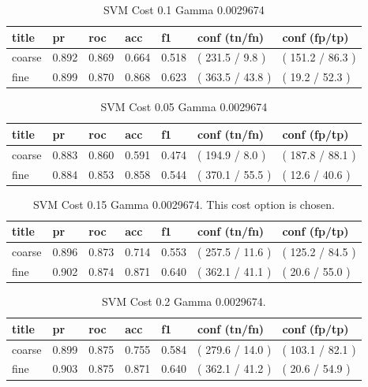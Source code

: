 \documentclass[ms]{nuthesis}
\begin{document}
\FloatBarrier
\begin{table}[H]
\centering
\caption{SVM Cost 0.1 Gamma 0.0029674}
\label{tab:SVM-Cp1-Gp0029674}
\begin{tabular}{|l||l||l||l||l||l||l|}\toprule
title & pr & roc & acc & f1 & conf (tn/fn) & conf (fp/tp) \\ \midrule
coarse & 0.892 & 0.869 & 0.664 & 0.518 & ( 231.5 / 9.8 ) & ( 151.2 / 86.3 ) \\
fine & 0.899 & 0.870 & 0.868 & 0.623 & ( 363.5 / 43.8 ) & ( 19.2 / 52.3 ) \\ \bottomrule
\end{tabular}
\end{table}
\FloatBarrier


\FloatBarrier
\begin{table}[H]
\centering
\caption{SVM Cost 0.05 Gamma 0.0029674}
\label{tab:SVM-Cp05-Gp0029674}
\begin{tabular}{|l||l||l||l||l||l||l|}\toprule
title & pr & roc & acc & f1 & conf (tn/fn) & conf (fp/tp) \\ \midrule
coarse & 0.883 & 0.860 & 0.591 & 0.474 & ( 194.9 / 8.0 ) & ( 187.8 / 88.1 ) \\
fine & 0.884 & 0.853 & 0.858 & 0.544 & ( 370.1 / 55.5 ) & ( 12.6 / 40.6 ) \\ \bottomrule
\end{tabular}
\end{table}
\FloatBarrier


\FloatBarrier
\begin{table}[H]
\centering
\caption{SVM Cost 0.15 Gamma 0.0029674. This cost option is chosen.}
\label{tab:SVM-Cp15-Gp0029674}
\begin{tabular}{|l||l||l||l||l||l||l|}\toprule
title & pr & roc & acc & f1 & conf (tn/fn) & conf (fp/tp) \\ \midrule
coarse & 0.896 & 0.873 & 0.714 & 0.553 & ( 257.5 / 11.6 ) & ( 125.2 / 84.5 ) \\
fine & 0.902 & 0.874 & 0.871 & 0.640 & ( 362.1 / 41.1 ) & ( 20.6 / 55.0 ) \\ \bottomrule
\end{tabular}
\end{table}
\FloatBarrier


\FloatBarrier
\begin{table}[H]
\centering
\caption{SVM Cost 0.2 Gamma 0.0029674.}
\label{tab:SVM-Cp2-Gp0029674}
\begin{tabular}{|l||l||l||l||l||l||l|}\toprule
title & pr & roc & acc & f1 & conf (tn/fn) & conf (fp/tp) \\ \midrule
coarse & 0.899 & 0.875 & 0.755 & 0.584 & ( 279.6 / 14.0 ) & ( 103.1 / 82.1 ) \\
fine & 0.903 & 0.875 & 0.871 & 0.640 & ( 362.1 / 41.2 ) & ( 20.6 / 54.9 ) \\ \bottomrule
\end{tabular}
\end{table}
\FloatBarrier
\end{document}
